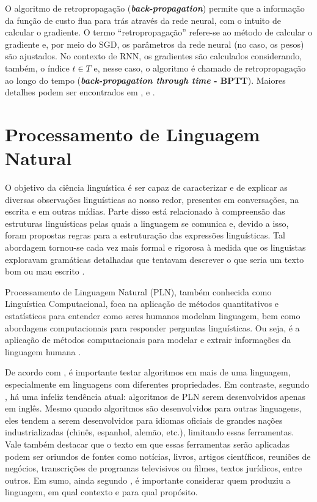 \documentclass{automatextcc}
\begin{document}
O algoritmo de retropropagação (\textbf{\textit{back-propagation}}) permite que a informação da função de custo flua para trás através da rede neural, com o intuito de calcular o gradiente. O termo ``retropropagação'' refere-se ao método de calcular o gradiente e, por meio do SGD, os parâmetros da rede neural (no caso, os pesos) são ajustados. No contexto de RNN, os gradientes são calculados considerando, também, o índice $t \in T$ e, nesse caso, o algoritmo é chamado de retropropagação ao longo do tempo (\textbf{\textit{back-propagation through time} - BPTT}). Maiores detalhes podem ser encontrados em \citet{haykin2009}, \citet{goodfellow2016} e \citet{fan2021}.  



\section{Processamento de Linguagem Natural}
O objetivo da ciência linguística é ser capaz de caracterizar e de explicar as diversas observações linguísticas ao nosso redor, presentes em conversações, na escrita e em outras mídias. Parte disso está relacionado à compreensão das estruturas linguísticas pelas quais a linguagem se comunica e, devido a isso, foram propostas regras para a estruturação das expressões linguísticas. Tal abordagem tornou-se cada vez mais formal e rigorosa à medida que os linguistas exploravam gramáticas detalhadas que tentavam descrever o que seria um texto bom ou mau escrito \citep{manning1999}.

Processamento de Linguagem Natural (PLN), também conhecida como Linguística Computacional, foca na aplicação de métodos quantitativos e estatísticos para entender como seres humanos modelam linguagem, bem como abordagens computacionais para responder perguntas linguísticas. Ou seja, é a aplicação de métodos computacionais para modelar e extrair informações da linguagem humana \citep{kamath2019}. 

De acordo com \citet{jurafsky2021}, é importante testar algoritmos em mais de uma linguagem, especialmente em linguagens com diferentes propriedades. Em contraste, segundo \citet{bender2019}, há uma infeliz tendência atual: algoritmos de PLN serem desenvolvidos apenas em inglês. Mesmo quando algoritmos são desenvolvidos para outras linguagens, eles tendem a serem desenvolvidos para idiomas oficiais de grandes nações industrializadas (chinês, espanhol, alemão, etc.), limitando essas ferramentas. Vale também destacar que o texto em que essas ferramentas serão aplicadas podem ser oriundos de fontes como notícias, livros, artigos científicos, reuniões de negócios, transcrições de programas televisivos ou filmes, textos jurídicos, entre outros. Em sumo, ainda segundo \citet{jurafsky2021}, é importante considerar quem produziu a linguagem, em qual contexto e para qual propósito.
\end{document}
